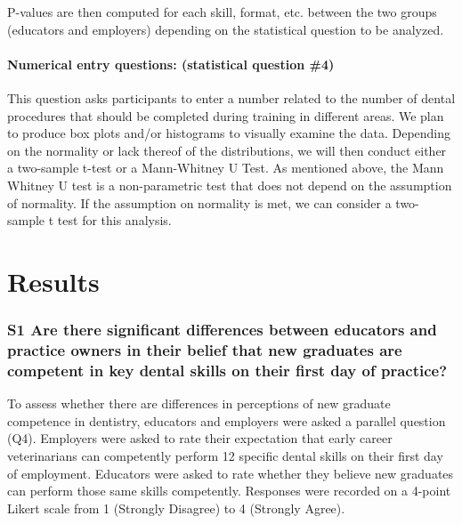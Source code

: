 \documentclass[
  11pt,
  letterpaper,
  DIV=11,
  numbers=noendperiod]{scrartcl}
\let\oldparagraph\paragraph
\renewcommand{\paragraph}[1]{\oldparagraph{#1}\mbox{}}
\numberwithin{figure}{section}
\begin{document}
P-values are then computed for each skill, format, etc. between the two
groups (educators and employers) depending on the statistical question
to be analyzed.

\hypertarget{numerical-entry-questions-statistical-question-4}{%
\paragraph{Numerical entry questions: (statistical question
\#4)}\label{numerical-entry-questions-statistical-question-4}}

This question asks participants to enter a number related to the number
of dental procedures that should be completed during training in
different areas. We plan to produce box plots and/or histograms to
visually examine the data. Depending on the normality or lack thereof of
the distributions, we will then conduct either a two-sample t-test or a
Mann-Whitney U Test. As mentioned above, the Mann Whitney U test is a
non-parametric test that does not depend on the assumption of normality.
If the assumption on normality is met, we can consider a two-sample t
test for this analysis.

\hypertarget{results}{%
\section{Results}\label{results}}

\hypertarget{s1-are-there-significant-differences-between-educators-and-practice-owners-in-their-belief-that-new-graduates-are-competent-in-key-dental-skills-on-their-first-day-of-practice}{%
\subsubsection{S1 Are there significant differences between educators
and practice owners in their belief that new graduates are competent in
key dental skills on their first day of
practice?}\label{s1-are-there-significant-differences-between-educators-and-practice-owners-in-their-belief-that-new-graduates-are-competent-in-key-dental-skills-on-their-first-day-of-practice}}

To assess whether there are differences in perceptions of new graduate
competence in dentistry, educators and employers were asked a parallel
question (Q4). Employers were asked to rate their expectation that early
career veterinarians can competently perform 12 specific dental skills
on their first day of employment. Educators were asked to rate whether
they believe new graduates can perform those same skills competently.
Responses were recorded on a 4-point Likert scale from 1 (Strongly
Disagree) to 4 (Strongly Agree).
\end{document}
